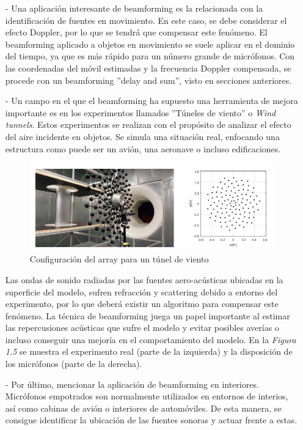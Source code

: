 \documentclass[a4paper,11pt]{book}
\begin{document}
			
			\begin{itemize}
				\item[-] Una aplicación interesante de beamforming es la relacionada con la identificación de fuentes en movimiento. En este caso, se debe considerar el efecto Doppler, por lo que se tendrá que compensar este fenómeno. El beamforming aplicado a objetos en movimiento se suele aplicar en el dominio del tiempo, ya que es más rápido para un número grande de micrófonos. Con las coordenadas del móvil estimadas y la frecuencia Doppler compensada, se procede con un beamforming ''delay and sum'', visto en secciones anteriores.
				\item[-] Un campo en el que el beamforming ha supuesto una herramienta de mejora importante es en los experimentos llamados ''Túneles de viento'' o \textit{Wind tunnels}. Estos experimentos se realizan con el propósito de analizar el efecto del aire incidente en objetos. Se simula una situación real, enfocando una estructura como puede ser un avión, una aeronave o incluso edificaciones. 
			\begin{figure}[hbtp]
			\centering
			\includegraphics[width = 12cm]{FIGURAS/wind_tunnel.JPG}
			\caption{Configuración del array para un túnel de viento}
			\end{figure}
			
			Las ondas de sonido radiadas por las fuentes aero-acústicas ubicadas en la superficie del modelo, sufren refracción y scattering debido a entorno del experimento, por lo que deberá existir un algoritmo para compensar este fenómeno. La técnica de beamforming juega un papel importante al estimar las repercusiones acústicas que sufre el modelo y evitar posibles averías o incluso conseguir una mejoría en el comportamiento del modelo. En la \textit{Figura 1.5} se muestra el experimento real (parte de la izquierda) y la disposición de los micrófonos (parte de la derecha).
				\item[-] Por último, mencionar la aplicación de beamforming en interiores. Micrófonos empotrados son normalmente utilizados en entornos de interios, así como cabinas de avión o interiores de automóviles. De esta manera, se consigue identificar la ubicación de las fuentes sonoras y actuar frente a estas.
			\end{itemize}
			
\end{document}
